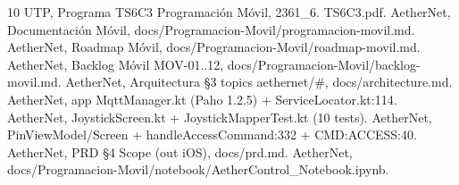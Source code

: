 \documentclass[conference]{IEEEtran}
\begin{document}
\begin{thebibliography}{10}
 UTP, Programa TS6C3 Programación Móvil, 2361\_6. TS6C3.pdf.
 AetherNet, Documentación Móvil, docs/Programacion-Movil/programacion-movil.md.
 AetherNet, Roadmap Móvil, docs/Programacion-Movil/roadmap-movil.md.
 AetherNet, Backlog Móvil MOV-01..12, docs/Programacion-Movil/backlog-movil.md.
 AetherNet, Arquitectura \S3 topics aethernet/\#, docs/architecture.md.
 AetherNet, app MqttManager.kt (Paho 1.2.5) + ServiceLocator.kt:114.
 AetherNet, JoystickScreen.kt + JoystickMapperTest.kt (10 tests).
 AetherNet, PinViewModel/Screen + handleAccessCommand:332 + CMD:ACCESS:40.
 AetherNet, PRD \S4 Scope (out iOS), docs/prd.md.
 AetherNet, docs/Programacion-Movil/notebook/AetherControl\_Notebook.ipynb.
\end{thebibliography}
\end{document}
